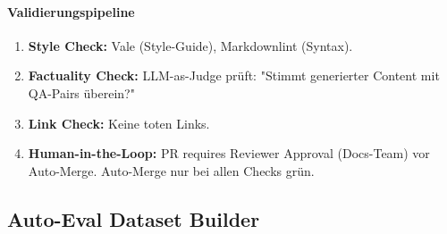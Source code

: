 \paragraph{Validierungspipeline}
\begin{enumerate}
    \item \textbf{Style Check:} Vale (Style-Guide), Markdownlint (Syntax).
    \item \textbf{Factuality Check:} LLM-as-Judge prüft: "Stimmt generierter Content mit QA-Pairs überein?"
    \item \textbf{Link Check:} Keine toten Links.
    \item \textbf{Human-in-the-Loop:} PR requires Reviewer Approval (Docs-Team) vor Auto-Merge. Auto-Merge nur bei allen Checks grün.
\end{enumerate}


\subsection{Auto-Eval Dataset Builder}

